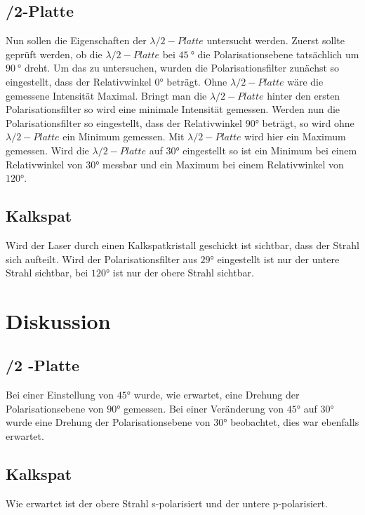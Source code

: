 \subsection{\lambda/2-Platte}
Nun sollen die Eigenschaften der $ \lambda /2 -Platte $ untersucht werden.
Zuerst sollte geprüft werden, ob die $ \lambda /2 -Platte $ bei $ \SI{45}{\degree} $ die Polarisationsebene tatsächlich um $ \SI{90}{\degree} $ dreht. Um das zu untersuchen, wurden die Polarisationsfilter zunächst so eingestellt, dass der Relativwinkel $ 0° $ beträgt. Ohne $ \lambda /2 -Platte $ wäre die gemessene Intensität Maximal. Bringt man die $ \lambda /2 -Platte $ hinter den ersten Polarisationsfilter so wird eine minimale Intensität gemessen. Werden nun die Polarisationsfilter so eingestellt, dass der Relativwinkel $ 90° $ beträgt, so wird ohne $ \lambda /2 -Platte $ ein Minimum gemessen. Mit $ \lambda /2 -Platte $ wird hier ein Maximum gemessen.
Wird die $ \lambda /2 -Platte $ auf $ 30° $ eingestellt so ist ein Minimum bei einem Relativwinkel von $ 30° $ messbar und ein Maximum bei einem Relativwinkel von $ 120° $.
\subsection{Kalkspat}
Wird der Laser durch einen Kalkspatkristall geschickt ist sichtbar, dass der Strahl sich aufteilt. Wird der Polarisationsfilter aus $ 29° $ eingestellt ist nur der untere Strahl sichtbar, bei $ 120° $ ist nur der obere Strahl sichtbar. 
\section{Diskussion}
\subsection{\lambda /2 -Platte}
Bei einer Einstellung von $ 45° $ wurde, wie erwartet, eine Drehung der Polarisationsebene von $ 90° $ gemessen.
Bei einer Veränderung von $ 45° $ auf $ 30° $ wurde eine Drehung der Polarisationsebene von $ 30° $ beobachtet, dies war ebenfalls erwartet.
\subsection{Kalkspat}
Wie erwartet ist der obere Strahl s-polarisiert und der untere p-polarisiert. 
